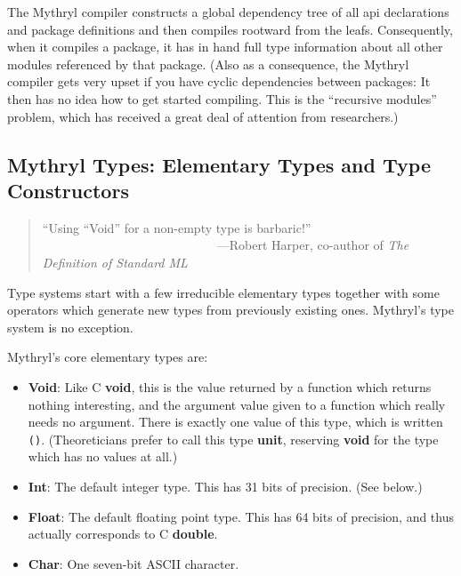 The Mythryl compiler constructs a global dependency tree of all api declarations 
and package definitions and then compiles rootward from the leafs.  Consequently, 
when it compiles a package, it has in hand full type information about all other 
modules referenced by that package.  (Also as a consequence, the Mythryl compiler 
gets very upset if you have cyclic dependencies between packages:  It then 
has no idea how to get started compiling.  This is the ``recursive modules'' 
problem, which has received a great deal of attention from researchers.)


\cutend*

\subsection{Mythryl Types:  Elementary Types and Type Constructors}

\begin{quote}\begin{tiny}
       ``Using ``Void'' for a non-empty type is barbaric!''\newline
         ~~~~~~~~~~~~~~~~~~~~~~~~~~~~---Robert Harper, co-author of {\it The Definition of Standard ML}
\end{tiny}\end{quote}

Type systems start with a few irreducible elementary types together 
with some operators which generate new types from previously existing 
ones.  Mythryl's type system is no exception.

Mythryl's core elementary types are:
\begin{itemize}
\item {\bf Void}:  Like C {\bf void}, this is the value returned by a function which returns 
nothing interesting, and the argument value given to a function which really needs 
no argument.  There is exactly one value of this type, which is written {\tt ()}. 
(Theoreticians prefer to call this type {\bf unit}, reserving {\bf void} for the type 
which has no values at all.)
\item {\bf Int}:  The default integer type.  This has 31 bits of precision. (See below.)
\item {\bf Float}:  The default floating point type.  This has 64 bits of precision, and 
thus actually corresponds to C {\bf double}.
\item {\bf Char}:  One seven-bit {\sc ASCII} character.
\end{itemize}

